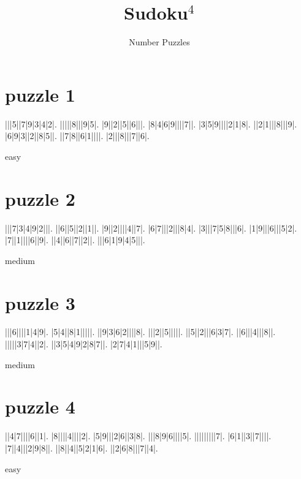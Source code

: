 \documentclass[fontsize=24pt,letterpaper]{scrartcl}
\title{Sudoku$^4$}
\author{Number Puzzles}
\begin{document}
\maketitle
\setcounter{page}{0}
\thispagestyle{empty}
\clearpage

\section{puzzle 1}
\vspace{2cm}
\begin{sudoku}
|||5||7|9|3|4|2|.
|||||8|||9|5|.
|9||2||5||6|||.
|8|4|6|9||||7||.
|3|5|9||||2|1|8|.
||2|1|||8|||9|.
|6|9|3||2||8|5||.
||7|8||6|1||||.
|2|||8|||7||6|.
\end{sudoku}
\begin{center}
    easy
\end{center}

\clearpage

\section{puzzle 2}
\vspace{2cm}
\begin{sudoku}
|||7|3|4|9|2|||.
||6||5||2||1||.
|9||2||||4||7|.
|6|7|||2|||8|4|.
|3|||7|5|8|||6|.
|1|9|||6|||5|2|.
|7||1||||6||9|.
||4||6||7||2||.
|||6|1|9|4|5|||.
\end{sudoku}
\begin{center}
   medium
\end{center}

\clearpage
\section{puzzle 3}
\vspace{2cm}
\begin{sudoku}
|||6||||1|4|9|.
|5|4||8|1|||||.
||9|3|6|2||||8|.
|||2||5|||||.
||5||2|||6|3|7|.
||6|||4|||8||.
|||||3|7|4||2|.
||3|5|4|9|2|8|7||.
|2|7|4|1|||5|9||.
\end{sudoku}
\begin{center}
    medium
\end{center}

\clearpage
\section{puzzle 4}
\vspace{2cm}
\begin{sudoku}
||4|7||||6||1|.
|8||||4||||2|.
|5|9|||2|6||3|8|.
|||8|9|6||||5|.
|||||||||7|.
|6|1||3||7||||.
|7||4|||2|9|8||.
||8||4||5|2|1|6|.
||2|6|8|||7||4|.
\end{sudoku}
\begin{center}
    easy
\end{center}
\end{document}
